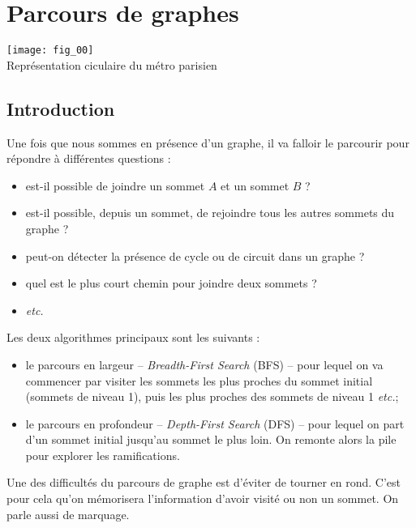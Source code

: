 \chapter{Parcours de graphes} 
 

\begin{marginfigure}
\texttt{[image: fig\_00]} \\
\caption{Représentation ciculaire du métro parisien}
\end{marginfigure}%



\section{Introduction}
Une fois que nous sommes en présence d'un graphe, il va falloir le parcourir pour répondre à différentes questions : 
\begin{itemize}
\item est-il possible de joindre un sommet $A$ et un sommet $B$ ?
\item est-il possible, depuis un sommet, de rejoindre tous les autres sommets du graphe ?
\item peut-on détecter la présence de cycle ou de circuit dans un graphe ?
\item quel est le plus court chemin pour joindre deux sommets ?
\item \textit{etc.}
\end{itemize}

Les deux algorithmes principaux sont les suivants :
\begin{itemize}
\item le parcours en largeur -- \textit{Breadth-First Search} (BFS) -- pour lequel on va commencer par visiter les sommets les plus proches du sommet initial (sommets de niveau 1), puis les plus proches des sommets de niveau 1 \textit{etc.};
\item le parcours en profondeur  -- \textit{Depth-First Search} (DFS) -- pour lequel on part d'un sommet initial jusqu'au sommet le plus loin. On remonte alors la pile pour explorer les ramifications.
\end{itemize}

Une des difficultés du parcours de graphe est d'éviter de tourner en rond. C'est pour cela qu'on mémorisera l'information d'avoir visité ou non un sommet.  On parle aussi de  marquage. 

